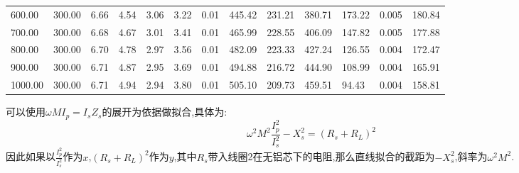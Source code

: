 \documentclass[UTF8,a4paper]{article}%
\begin{document}
\begin{table}[H]
\begin{tabular}{lllllllllllll}
        600.00             & 300.00                  & 6.66                & 4.54              & 3.06                         & 3.22                   & 0.01             & 445.42             & 231.21                & 380.71                & 173.22             & 0.005            & 180.84             \\
        700.00             & 300.00                  & 6.68                & 4.67              & 3.01                         & 3.41                   & 0.01             & 465.99             & 228.55                & 406.09                & 147.82             & 0.005            & 177.88             \\
        800.00             & 300.00                  & 6.70                & 4.78              & 2.97                         & 3.56                   & 0.01             & 482.09             & 223.33                & 427.24                & 126.55             & 0.004            & 172.47             \\
        900.00             & 300.00                  & 6.71                & 4.87              & 2.95                         & 3.69                   & 0.01             & 494.88             & 216.72                & 444.90                & 108.99             & 0.004            & 165.91             \\
        1000.00            & 300.00                  & 6.71                & 4.94              & 2.94                         & 3.80                   & 0.01             & 505.10             & 209.73                & 459.51                & 94.43              & 0.004            & 158.81             \\ \hline
    \end{tabular}
\end{table}

可以使用$\omega MI_p=I_sZ_s$的展开为依据做拟合,具体为:
$$\omega^2M^2\frac{I_p^2}{I_s^2}-X_s^2=(R_s+R_L)^2$$
因此如果以$\frac{I_p^2}{I_s^2}$作为$x$,$(R_s+R_L)^2$作为$y$,其中$R_s$带入线圈2在无铝芯下的电阻,那么直线拟合的截距为$-X_s^2$,斜率为$\omega^2M^2$.
\end{document}
